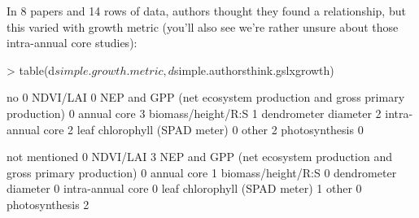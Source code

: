 \documentclass[11pt]{article}
\begin{document}
In 8 papers and 14 rows of data, authors thought they found a relationship, but this varied with growth metric (you'll also see we're rather unsure about those intra-annual core studies):
\begin{Schunk}
\begin{Sinput}
> table(d$simple.growth.metric, d$simple.authorsthink.gslxgrowth)
\end{Sinput}
\begin{Soutput}
                                                                      no
                                                                       0
  NDVI/LAI                                                             0
  NEP and GPP (net ecosystem production and gross primary production)  0
  annual core                                                          3
  biomass/height/R:S                                                   1
  dendrometer diameter                                                 2
  intra-annual core                                                    2
  leaf chlorophyll (SPAD meter)                                        0
  other                                                                2
  photosynthesis                                                       0
                                                                     
                                                                      not mentioned
                                                                                  0
  NDVI/LAI                                                                        3
  NEP and GPP (net ecosystem production and gross primary production)             0
  annual core                                                                     1
  biomass/height/R:S                                                              0
  dendrometer diameter                                                            0
  intra-annual core                                                               0
  leaf chlorophyll (SPAD meter)                                                   1
  other                                                                           0
  photosynthesis                                                                  2
                                                                     

\end{Soutput}
\end{Schunk}
\end{document}
